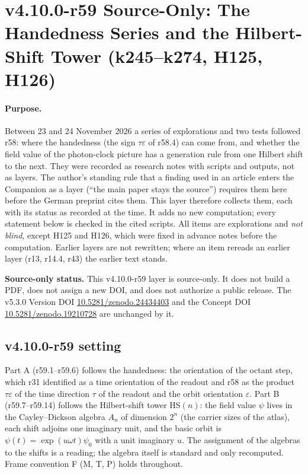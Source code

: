\clearpage
\section*{v4.10.0-r59 Source-Only: The Handedness Series and the Hilbert-Shift Tower (k245--k274, H125, H126)}
\label{sec:v4100-r59-handedness-tower}

\paragraph{Purpose.}
Between 23 and 24 November 2026 a series of explorations and two tests followed r58: where the handedness (the sign \(\tau\varepsilon\) of
r58.4) can come from, and whether the field value of the photon-clock picture has a generation rule from one Hilbert shift to the next.
They were recorded as research notes with scripts and outputs, not as layers.  The author's standing rule that a finding used in an article
enters the Companion as a layer (``the main paper stays the source'') requires them here before the German preprint cites them.  This layer
therefore collects them, each with its status as recorded at the time.  It adds no new computation; every statement below is checked in the
cited scripts.  All items are explorations and \emph{not blind}, except H125 and H126, which were fixed in advance notes before the computation.
Earlier layers are not rewritten; where an item rereads an earlier layer (r13, r14.4, r43) the earlier text stands.

\noindent\textbf{Source-only status.}
This v4.10.0-r59 layer is source-only.  It does not build a PDF, does not assign a new DOI,
and does not authorize a public release.  The v5.3.0 Version DOI
\href{https://doi.org/10.5281/zenodo.24434403}{10.5281/zenodo.24434403} and the Concept DOI
\href{https://doi.org/10.5281/zenodo.19210728}{10.5281/zenodo.19210728} are unchanged by it.

\subsection*{v4.10.0-r59 setting}
\label{subsec:v4100-r59-setting}

Part A (r59.1--r59.6) follows the handedness: the orientation of the octant step, which r31 identified as a time orientation of the readout
and r58 as the product \(\tau\varepsilon\) of the time direction \(\tau\) of the readout and the orbit orientation \(\varepsilon\).
Part B (r59.7--r59.14) follows the Hilbert-shift tower HS\((n)\): the field value \(\psi\) lives in the Cayley--Dickson algebra \(A_n\) of
dimension \(2^n\) (the carrier sizes of the atlas), each shift adjoins one imaginary unit, and the basic orbit is
\(\psi(t)=\exp(u\omega t)\psi_0\) with a unit imaginary \(u\).  The assignment of the algebras to the shifts is a reading; the algebra itself is
standard and only recomputed.  Frame convention F (M, T, P) holds throughout.


